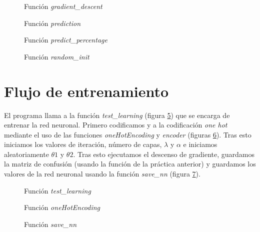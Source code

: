 \documentclass[6pt]{../../shared/AiTex}
\begin{document}
\begin{figure}[H]
    \centering
    
    \caption{Función \textit{gradient\_descent}}
    \label{fig:gradient_descent}
\end{figure}

\begin{figure}[H]
    \centering
    
    \caption{Función \textit{prediction}}
    \label{fig:prediction}
\end{figure}

\begin{figure}[H]
    \centering
    
    \caption{Función \textit{predict\_percentage}}
    \label{fig:predict_percentage}
\end{figure}

\begin{figure}[H]
    \centering
    
    \caption{Función \textit{random\_init}}
    \label{fig:random_init}
\end{figure}

\section{Flujo de entrenamiento}

El programa llama a la función \textit{test\_learning} (figura \ref{fig:train_test}) que se encarga de entrenar la red neuronal. Primero codificamos y a la codificación \textit{one hot} mediante el uso de las funciones \textit{oneHotEncoding} y \textit{encoder} (figuras \ref{fig:oneHotEncoding}). Tras esto iniciamos los valores de iteración, número de capas, $\lambda$ y $\alpha$ e iniciamos aleatoriamente $\theta 1$ y $\theta 2$. Tras esto ejecutamos el descenso de gradiente, guardamos la matriz de confusión (usando la función de la práctica anterior) y guardamos los valores de la red neuronal usando la función \textit{save\_nn} (figura \ref{fig:save_nn}).

\begin{figure}[H]
    \centering
    
    \caption{Función \textit{test\_learning}}
    \label{fig:train_test}
\end{figure}

\begin{figure}[H]
    \centering
    
    \caption{Función \textit{oneHotEncoding}}
    \label{fig:oneHotEncoding}
\end{figure}
\begin{figure}[H]
    \centering
    
    \caption{Función \textit{save\_nn}}
    \label{fig:save_nn}
\end{figure}
\end{document}
